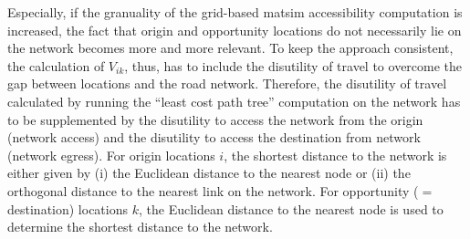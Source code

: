 Especially, if the granuality of the grid-based \gls{matsim} accessibility computation is increased, the fact that 
origin and opportunity locations do not necessarily lie on the network becomes more and more relevant. To keep the 
approach consistent, the calculation of $V_{ik}$, thus, has to include the disutility of travel to overcome the gap 
between locations and the road network. Therefore, the disutility of travel calculated by running the ``least cost 
path tree'' computation on the network has to be supplemented by the disutility to access the network from the origin 
(network access) and the disutility to access the destination from network (network egress). For origin locations $i$, 
the shortest distance to the network is either given by (i) the Euclidean distance to the nearest node or (ii) the 
orthogonal distance to the nearest link on the network.
For opportunity ($=$ destination) locations $k$, the Euclidean distance to the nearest node is used to determine
the shortest distance to the network.

%


